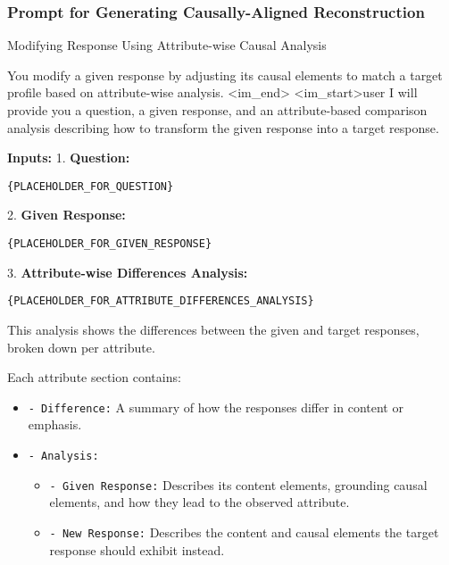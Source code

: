 \clearpage
\subsubsection{Prompt for Generating Causally-Aligned Reconstruction}
\begin{promptbox}{Modifying Response Using Attribute-wise Causal Analysis}

You modify a given response by adjusting its causal elements to match a target profile based on attribute-wise analysis.
\textless{}\textbar{}im\_end\textbar{}\textgreater{}
\textless{}\textbar{}im\_start\textbar{}\textgreater{}user
I will provide you a question, a given response, and an attribute-based comparison analysis describing how to transform the given response into a target response.

\textbf{Inputs:}
1. \textbf{Question:}
\begin{verbatim}
{PLACEHOLDER_FOR_QUESTION}
\end{verbatim}

2. \textbf{Given Response:}
\begin{verbatim}
{PLACEHOLDER_FOR_GIVEN_RESPONSE}
\end{verbatim}

3. \textbf{Attribute-wise Differences Analysis:}
\begin{verbatim}
{PLACEHOLDER_FOR_ATTRIBUTE_DIFFERENCES_ANALYSIS}
\end{verbatim}

This analysis shows the differences between the given and target responses, broken down per attribute.

Each attribute section contains:
\begin{itemize}[leftmargin=2em] %
    \item \texttt{- Difference:} A summary of how the responses differ in content or emphasis.
    \item \texttt{- Analysis:}
    \begin{itemize}[leftmargin=2em] %
        \item \texttt{- Given Response:} Describes its content elements, grounding causal elements, and how they lead to the observed attribute.
        \item \texttt{- New Response:} Describes the content and causal elements the target response should exhibit instead.
    \end{itemize}
\end{itemize}


\end{promptbox}
